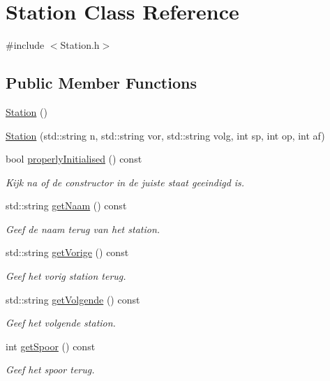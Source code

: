 \hypertarget{class_station}{}\section{Station Class Reference}
\label{class_station}


{\ttfamily \#include $<$Station.\+h$>$}

\subsection*{Public Member Functions}
\begin{DoxyCompactItemize}
\item 
\hyperlink{class_station_a73d335726aad1d844d81cda6d9fd74e6}{Station} ()
\item 
\hyperlink{class_station_a41fd39388109ad33ea86eb9831ab2f45}{Station} (std\+::string n, std\+::string vor, std\+::string volg, int sp, int op, int af)
\item 
bool \hyperlink{class_station_a9ce626dd0599e3ea8107404a59c21e16}{properly\+Initialised} () const
\begin{DoxyCompactList}\small\item\em Kijk na of de constructor in de juiste staat geeindigd is. \end{DoxyCompactList}\item 
std\+::string \hyperlink{class_station_aea6c31c39a5e1eb4c30337e7ce489e69}{get\+Naam} () const
\begin{DoxyCompactList}\small\item\em Geef de naam terug van het station. \end{DoxyCompactList}\item 
std\+::string \hyperlink{class_station_a6776dd16c23da9f512d82883ea896fea}{get\+Vorige} () const
\begin{DoxyCompactList}\small\item\em Geef het vorig station terug. \end{DoxyCompactList}\item 
std\+::string \hyperlink{class_station_a1c9f9e7d77d74e7b06bf627bcb2c0067}{get\+Volgende} () const
\begin{DoxyCompactList}\small\item\em Geef het volgende station. \end{DoxyCompactList}\item 
int \hyperlink{class_station_a081ca6373631199a30ebab56f50022d8}{get\+Spoor} () const
\begin{DoxyCompactList}\small\item\em Geef het spoor terug. \end{DoxyCompactList}\item 

\end{DoxyCompactItemize}
